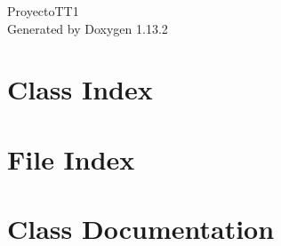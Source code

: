 \documentclass[twoside]{book}
\newcommand{\+}{\discretionary{\mbox{\scriptsize$\hookleftarrow$}}{}{}}
\newcommand{\clearemptydoublepage}{%
    \newpage{\pagestyle{empty}\cleardoublepage}%
  }
\begin{document}
  \raggedbottom
    \hypersetup{pageanchor=false,
                bookmarksnumbered=true,
                pdfencoding=unicode
               }
  \begin{titlepage}
  \vspace*{7cm}
  \begin{center}%
  {\Large Proyecto\+TT1}\\
  \vspace*{1cm}
  {\large Generated by Doxygen 1.13.2}\\
  \end{center}
  \end{titlepage}
  \clearemptydoublepage
  \tableofcontents
  \clearemptydoublepage
  \hypersetup{pageanchor=true}

\chapter{Class Index}

\chapter{File Index}

\chapter{Class Documentation}



\end{document}

